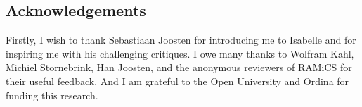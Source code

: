 \documentclass{svproc}
\begin{document}
\subsection{Acknowledgements}
\label{sct:Acknowledgements}
	Firstly, I wish to thank Sebastiaan Joosten for introducing me to Isabelle and for inspiring me with his challenging critiques.
	I owe many thanks to Wolfram Kahl, Michiel Stornebrink, Han Joosten, and the anonymous reviewers of RAMiCS for their useful feedback.
	And I am grateful to the Open University and Ordina for funding this research.


\end{document}
